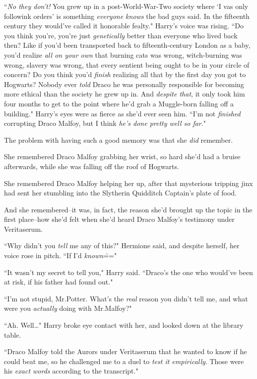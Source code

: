 ``\emph{No they don't!} You grew up in a post-World-War-Two society where `I vas only followink orders' is something \emph{everyone knows} the bad guys said. In the fifteenth century they would've called it honorable fealty." Harry's voice was rising. ``Do you think you're, you're just \emph{genetically} better than everyone who lived back then? Like if you'd been transported back to fifteenth-century London as a baby, you'd realize \emph{all on your own} that burning cats was wrong, witch-burning was wrong, slavery was wrong, that every sentient being ought to be in your circle of concern? Do you think you'd \emph{finish} realizing all that by the first day you got to Hogwarts? Nobody ever \emph{told} Draco he was personally responsible for becoming more ethical than the society he grew up in. And \emph{despite that}, it only took him four months to get to the point where he'd grab a Muggle-born falling off a building." Harry's eyes were as fierce as she'd ever seen him. ``I'm not \emph{finished} corrupting Draco Malfoy, but I think \emph{he's done pretty well so far}."

The problem with having such a good memory was that she \emph{did} remember.

She remembered Draco Malfoy grabbing her wrist, so hard she'd had a bruise afterwards, while she was falling off the roof of Hogwarts.

She remembered Draco Malfoy helping her up, after that mysterious tripping jinx had sent her stumbling into the Slytherin Quidditch Captain's plate of food.

And she remembered\---it was, in fact, the reason she'd brought up the topic in the first place\---how she'd felt when she'd heard Draco Malfoy's testimony under Veritaserum.

``Why didn't you \emph{tell} me any of this?" Hermione said, and despite herself, her voice rose in pitch. ``If I'd \emph{known}\==="

``It wasn't my secret to tell you," Harry said. ``Draco's the one who would've been at risk, if his father had found out."

``I'm not stupid, Mr.\?Potter. What's the \emph{real} reason you didn't tell me, and what were you \emph{actually} doing with Mr.\?Malfoy?"

``Ah. Well{\ldots}" Harry broke eye contact with her, and looked down at the library table.

``Draco Malfoy told the Aurors under Veritaserum that he wanted to know if he could beat me, so he challenged me to a duel to \emph{test it empirically}. Those were his \emph{exact words} according to the transcript."

